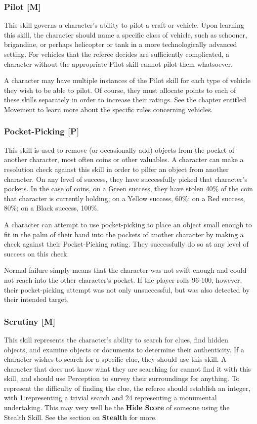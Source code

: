 \documentclass[oneside]{book}
\begin{document}
\begin{multicols}{2}
\subsubsection{Pilot [M]}
This skill governs a character's ability to pilot a craft or vehicle. Upon learning this skill, the character should name a specific class of vehicle, such as schooner, brigandine, or perhaps helicopter or tank in a more technologically advanced setting. For vehicles that the referee decides are sufficiently complicated, a character without the appropriate Pilot skill cannot pilot them whatsoever.

A character may have multiple instances of the Pilot skill for each type of vehicle they wish to be able to pilot. Of course, they must allocate points to each of these skills separately in order to increase their ratings.
See the chapter entitled Movement to learn more about the specific rules concerning vehicles. 

\subsubsection{Pocket-Picking [P]}
This skill is used to remove (or occasionally add) objects from the pocket of another character, most often coins or other valuables. A character can make a resolution check against this skill in order to pilfer an object from another character. On any level of success, they have successfully picked that character's pockets. In the case of coins, on a Green success, they have stolen 40\% of the coin that character is currently holding; on a Yellow success, 60\%; on a Red success, 80\%; on a Black success, 100\%.

A character can attempt to use pocket-picking to place an object small enough to fit in the palm of their hand into the pockets of another character by making a check against their Pocket-Picking rating. They successfully do so at any level of success on this check.

Normal failure simply means that the character was not swift enough and could not reach into the other character's pocket. If the player rolls 96-100, however, their pocket-picking attempt was not only unsuccessful, but was also detected by their intended target.

\subsubsection{Scrutiny [M]}
This skill represents the character's ability to search for clues, find hidden objects, and examine objects or documents to determine their authenticity. If a character wishes to search for a specific clue, they should use this skill.  A character that does not know what they are searching for cannot find it with this skill, and should use Perception to survey their surroundings for anything. To represent the difficulty of finding the clue, the referee should establish an integer, with 1 representing a trivial search and 24 representing a monumental undertaking. This may very well be the \textbf{Hide Score} of someone using the Stealth Skill. See the section on \textbf{Stealth} for more.


\end{multicols}
\end{document}
